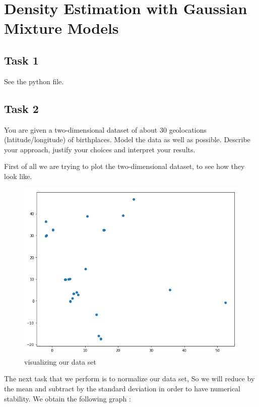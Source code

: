 \documentclass[12pt,twoside]{article}
\begin{document}
\section*{Density Estimation with Gaussian Mixture Models}

\subsection*{Task 1}

See the python file.

\subsection*{Task 2}

You are given a two-dimensional dataset of about 30 geolocations (latitude/longitude) of birthplaces. Model the data as well as possible. Describe your approach, justify your choices and interpret your results.


First of all we are trying to plot the two-dimensional dataset, to see how they look like.
\begin{center}
	\begin{figure}
		\includegraphics[scale=0.7]{1.png}
		\caption{visualizing our data set}	     
	\end{figure}
\end{center}

The next task that we perform is to normalize our data set, So we will reduce by the mean and subtract by the standard deviation in order to have numerical stability.
We obtain the following graph :
\end{document}

